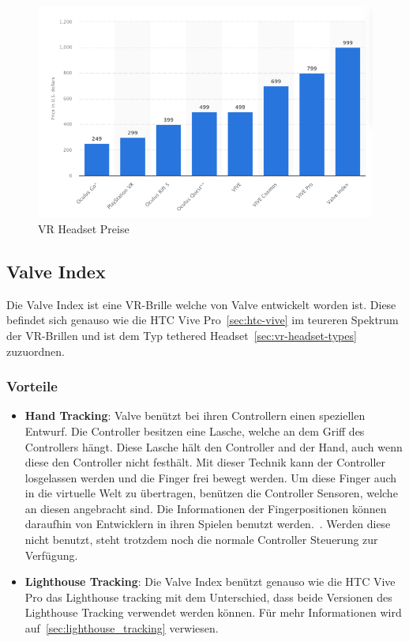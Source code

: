 \begin{figure}
    \centering
    \includegraphics[scale=0.5]{pics/vr_headset_price_statistic}
    \caption{VR Headset Preise~\cite{ALSOP_2019}}
    \label{fig:vr_headset_prices}
\end{figure}

\subsection{Valve Index}

Die Valve Index ist eine VR-Brille welche von Valve entwickelt worden ist.
Diese befindet sich genauso wie die HTC Vive Pro~\ref{sec:htc-vive} im teureren Spektrum~\cite{ALSOP_2019} der VR-Brillen und ist dem Typ tethered Headset~\ref{sec:vr-headset-types} zuzuordnen.

\subsubsection{Vorteile}

\begin{itemize}
    \item \textbf{Hand Tracking}: Valve benützt bei ihren Controllern einen speziellen Entwurf.
    Die Controller besitzen eine Lasche, welche an dem Griff des Controllers hängt.
    Diese Lasche hält den Controller and der Hand, auch wenn diese den Controller nicht festhält.
    Mit dieser Technik kann der Controller losgelassen werden und die Finger frei bewegt werden.
    Um diese Finger auch in die virtuelle Welt zu übertragen, benützen die Controller Sensoren, welche an diesen angebracht sind.
    Die Informationen der Fingerpositionen können daraufhin von Entwicklern in ihren Spielen benutzt werden.~\cite{SadlyItsBradley_2019}.
    Werden diese nicht benutzt, steht trotzdem noch die normale Controller Steuerung zur Verfügung.
    \item \textbf{Lighthouse Tracking}: Die Valve Index benützt genauso wie die HTC Vive Pro das Lighthouse tracking mit dem Unterschied, dass beide Versionen des Lighthouse Tracking verwendet werden können.
    Für mehr Informationen wird auf~\ref{sec:lighthouse_tracking} verwiesen.
\end{itemize}

